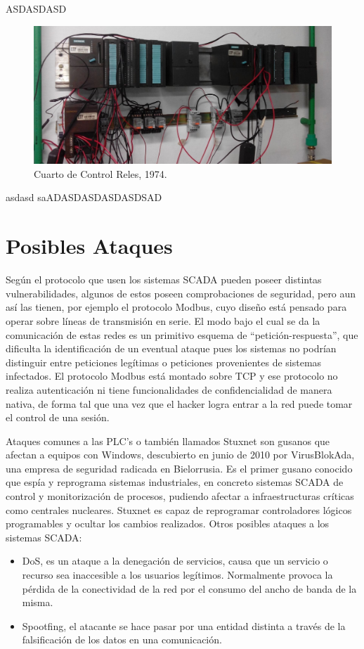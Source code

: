 \documentclass[jou,apacite]{apa6}   %
\begin{document}
ASDASDASD
\begin{figure}[htb]
\centering
\includegraphics[scale=0.2]{images/s73002.jpg}
\caption{Cuarto de Control Reles, 1974.} \label{fig:horizonte}
\end{figure}

asdasd
saADASDASDASDASDSAD

\section{Posibles Ataques }
Según el protocolo que usen los sistemas SCADA pueden poseer distintas vulnerabilidades, algunos de estos poseen comprobaciones de seguridad, pero aun así las tienen, por ejemplo el protocolo Modbus, cuyo diseño está pensado para operar sobre líneas de transmisión en serie. El modo bajo el cual se da la comunicación de estas redes es un primitivo esquema de “petición-respuesta”, que dificulta la identificación de un eventual ataque pues los sistemas no podrían distinguir entre peticiones legítimas o peticiones provenientes de sistemas infectados. El protocolo Modbus está montado sobre TCP y ese protocolo no realiza autenticación ni tiene funcionalidades de confidencialidad de manera nativa, de forma tal que una vez que el hacker logra entrar a la red puede tomar el control de una sesión.

Ataques comunes a las PLC’s o también llamados Stuxnet son gusanos que afectan a equipos con Windows, descubierto en junio de 2010 por VirusBlokAda, una empresa de seguridad radicada en Bielorrusia. Es el primer gusano conocido que espía y reprograma sistemas industriales, en concreto sistemas SCADA de control y monitorización de procesos, pudiendo afectar a infraestructuras críticas como centrales nucleares. 
Stuxnet es capaz de reprogramar controladores lógicos programables y ocultar los cambios realizados. 
Otros posibles ataques a los sistemas SCADA:

\begin{itemize}
\item DoS, es un ataque a la denegación de servicios, causa que un servicio o recurso sea inaccesible a los usuarios legítimos. Normalmente provoca la pérdida de la conectividad de la red por el consumo del ancho de banda de la misma.
\item Spootfing, el atacante se hace pasar por una entidad distinta a través de la falsificación de los datos en una comunicación.
\end{itemize}
\end{document}
